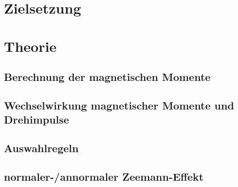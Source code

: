 \section{Zielsetzung}
\label{sec:Zielsetzung}

\section{Theorie}
\label{sec:Theorie}

\subsection{Berechnung der magnetischen Momente}
\label{sec:Berechnung_magnetischer_Momente}

\subsection{Wechselwirkung magnetischer Momente und Drehimpulse}
\label{sec:Wechselwirkungen}

\subsection{Auswahlregeln}
\label{sec:Auswahlregeln}

\subsection{normaler-/annormaler Zeemann-Effekt}
\label{sec:Zeemann}



